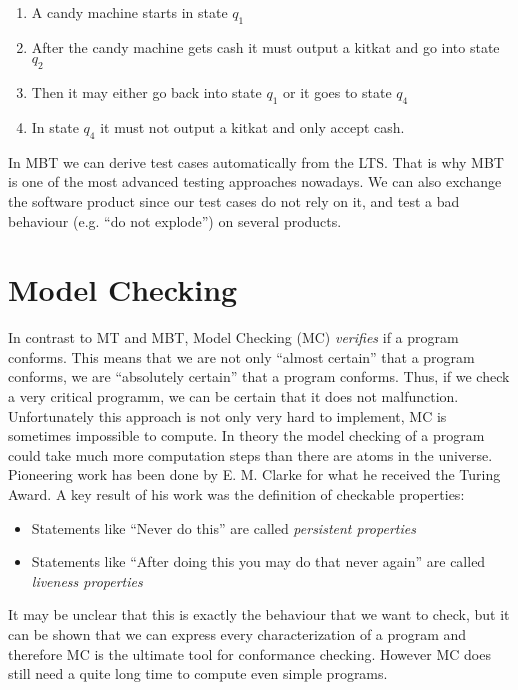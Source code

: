 \documentclass[a4paper, 12pt]{article} %
\begin{document}
\begin{enumerate}
  \item A candy machine starts in state $q_1$
  \item After the candy machine gets cash it must output a
  kitkat and go into state $q_2$
  \item Then it may either go back into state $q_1$ or it goes to state $q_4$
  \item In state $q_4$ it must not output a kitkat and only accept cash.
\end{enumerate}

In MBT we can derive test cases automatically from the LTS. That is why MBT
is one of the most advanced testing approaches nowadays. We can also exchange
the software product since our test cases do not rely on it, and test a bad
behaviour (e.g. ``do not explode'') on several products. 

\section*{Model Checking}
In contrast to MT and MBT, Model Checking (MC) \textit{verifies} if a
program conforms. This means that we are not only ``almost certain'' that a program
conforms, we are ``absolutely certain'' that a program conforms. Thus, if we
check a very critical programm, we can be certain that it does not malfunction.
Unfortunately this approach is not only very hard to implement, MC is sometimes
impossible to compute. In theory the model checking of a program could take much
more computation steps than there are atoms in the universe. Pioneering work has
been done by E. M. Clarke for what he received the Turing Award. A key result of
his work was the definition of checkable properties:
\begin{itemize}
  \item Statements like ``Never do {\color{red}this}'' are called
  \textit{persistent properties}
  \item Statements like ``After doing {\color{red}this} you may do
  {\color{blue}that} never again'' are called \textit{liveness properties}
\end{itemize}

It may be unclear that this is exactly the behaviour that we want to check, but
it can be shown that we can express every characterization of a program and
therefore MC is the ultimate tool for conformance checking. However MC does
still need a quite long time to compute even simple programs. 
\end{document}
